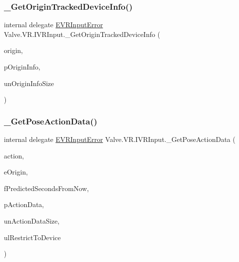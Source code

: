 \subsubsection{\texorpdfstring{\_GetOriginTrackedDeviceInfo()}{\_GetOriginTrackedDeviceInfo()}}
{\footnotesize\ttfamily internal delegate \mbox{\hyperlink{namespace_valve_1_1_v_r_a592d7f4189b8346d6c96dbdbaa35bc1b}{E\+V\+R\+Input\+Error}} Valve.\+V\+R.\+I\+V\+R\+Input.\+\_\+\+Get\+Origin\+Tracked\+Device\+Info (\begin{DoxyParamCaption}\item[{ulong}]{origin,  }\item[{ref \mbox{\hyperlink{struct_valve_1_1_v_r_1_1_input_origin_info__t}{Input\+Origin\+Info\+\_\+t}}}]{p\+Origin\+Info,  }\item[{uint}]{un\+Origin\+Info\+Size }\end{DoxyParamCaption})}

\mbox{\label{struct_valve_1_1_v_r_1_1_i_v_r_input_aeb5a782b37d5126d81e5a1a21fa69500}} 
\subsubsection{\texorpdfstring{\_GetPoseActionData()}{\_GetPoseActionData()}}
{\footnotesize\ttfamily internal delegate \mbox{\hyperlink{namespace_valve_1_1_v_r_a592d7f4189b8346d6c96dbdbaa35bc1b}{E\+V\+R\+Input\+Error}} Valve.\+V\+R.\+I\+V\+R\+Input.\+\_\+\+Get\+Pose\+Action\+Data (\begin{DoxyParamCaption}\item[{ulong}]{action,  }\item[{\mbox{\hyperlink{namespace_valve_1_1_v_r_a29be99a3c2f780157bd490db06a7f12f}{E\+Tracking\+Universe\+Origin}}}]{e\+Origin,  }\item[{float}]{f\+Predicted\+Seconds\+From\+Now,  }\item[{ref \mbox{\hyperlink{struct_valve_1_1_v_r_1_1_input_pose_action_data__t}{Input\+Pose\+Action\+Data\+\_\+t}}}]{p\+Action\+Data,  }\item[{uint}]{un\+Action\+Data\+Size,  }\item[{ulong}]{ul\+Restrict\+To\+Device }\end{DoxyParamCaption})}

\mbox{\label{struct_valve_1_1_v_r_1_1_i_v_r_input_ab2dfec875e32f9da69b95675a94957a7}} 
